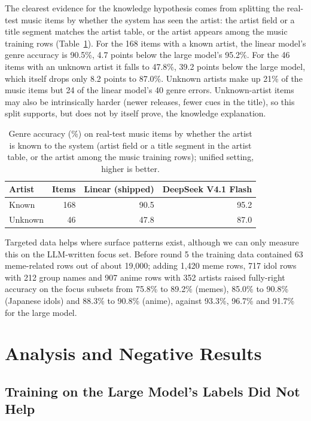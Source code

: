 \documentclass[11pt]{article}
\begin{document}
The clearest evidence for the knowledge hypothesis comes from splitting the real-test music items by whether the system has seen the artist: the artist field or a title segment matches the artist table, or the artist appears among the music training rows (Table~\ref{tab:known}). For the 168 items with a known artist, the linear model's genre accuracy is 90.5\%, 4.7 points below the large model's 95.2\%. For the 46 items with an unknown artist it falls to 47.8\%, 39.2 points below the large model, which itself drops only 8.2 points to 87.0\%. Unknown artists make up 21\% of the music items but 24 of the linear model's 40 genre errors. Unknown-artist items may also be intrinsically harder (newer releases, fewer cues in the title), so this split supports, but does not by itself prove, the knowledge explanation.

\begin{table}[t]
  \centering
  \small
  \caption{Genre accuracy (\%) on real-test music items by whether the artist is known to the system (artist field or a title segment in the artist table, or the artist among the music training rows); unified setting, higher is better.}
  \label{tab:known}
  \begin{tabular}{@{}lrrr@{}}
    \toprule
    Artist & Items & Linear (shipped) & DeepSeek V4.1 Flash \\
    \midrule
    Known & 168 & 90.5 & 95.2 \\
    Unknown & 46 & 47.8 & 87.0 \\
    \bottomrule
  \end{tabular}
\end{table}

Targeted data helps where surface patterns exist, although we can only measure this on the LLM-written focus set. Before round 5 the training data contained 63 meme-related rows out of about 19,000; adding 1,420 meme rows, 717 idol rows with 212 group names and 907 anime rows with 352 artists raised fully-right accuracy on the focus subsets from 75.8\% to 89.2\% (memes), 85.0\% to 90.8\% (Japanese idols) and 88.3\% to 90.8\% (anime), against 93.3\%, 96.7\% and 91.7\% for the large model.

\section{Analysis and Negative Results}
\label{sec:analysis}

\subsection{Training on the Large Model's Labels Did Not Help}
\label{sec:distill}
\end{document}
